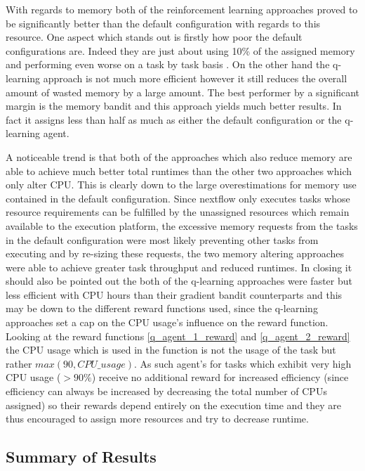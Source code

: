 With regards to memory both of the reinforcement learning approaches proved to be significantly better than the default configuration with regards to this resource. One aspect which stands out is firstly how poor the default configurations are. Indeed they are just about using 10\% of the assigned memory and performing even worse on a task by task basis . On the other hand the q-learning approach is not much more efficient however it still reduces the overall amount of wasted memory by a large amount. The best performer by a significant margin is the memory bandit and this approach yields much better results. In fact it assigns less than half as much as either the default configuration or the q-learning agent. 

A noticeable trend is that both of the approaches which also reduce memory are able to achieve much better total runtimes than the other two approaches which only alter CPU. This is clearly down to the large overestimations for memory use contained in the default configuration. Since nextflow only executes tasks whose resource requirements can be fulfilled by the unassigned resources which remain available to the execution platform, the excessive memory requests from the tasks in the default configuration were most likely preventing other tasks from executing and by re-sizing these requests, the two memory altering approaches were able to achieve greater task throughput and reduced runtimes. In closing it should also be pointed out the both of the q-learning approaches were faster but less efficient with CPU hours than their gradient bandit counterparts and this may be down to the different reward functions used, since the q-learning approaches set a cap on the CPU usage’s influence on the reward function. Looking at the reward functions \ref{q_agent_1_reward} and \ref{q_agent_2_reward} the CPU usage which is used in the function is not the usage of the task but rather $max(90,CPU\_usage)$. As such agent’s for tasks which exhibit very high CPU usage ($>90\%$) receive no additional reward for increased efficiency (since efficiency can always be increased by decreasing the total number of CPUs assigned) so their rewards depend entirely on the execution time and they are thus encouraged to assign more resources and try to decrease runtime.

\subsection{Summary of Results}
\label{sub:summary}

